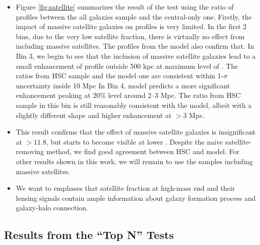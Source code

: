 \documentclass[a4paper,fleqn,usenatbib]{mnras}
\begin{document}
\begin{itemize}
        \item Figure \ref{fig:satellite} summarizes the result of the test using the ratio
            of \dsigma{} profiles between the all galaxies sample and the central-only one.
            Firstly, the impact of massive satellite galaxies on \dsigma{} profiles is very limited.
            In the first 2 bins, due to the very low satellite fraction, there is virtually no 
            effect from including massive satellites. 
            The \dsigma{} profiles from the model also confirm that.
            In Bin 3, we begin to see that the inclusion of massive satellite galaxies
            lead to a small enhancement of \dsigma{} profile outside 500 kpc at maximum level 
            of . The ratios from HSC sample and the  model one are consistent 
            within 1-$\sigma$ uncertainty inside 10 Mpc
            In Bin 4,  model predicts a more significant enhancement peaking at 
            20\% level around 2--3 Mpc.
            The ratio from HSC sample in this bin is still reasonably consistent with the model,
            albeit with a slightly different shape and higher enhancement at $>3$ Mpc.

        \item This result confirms that the effect of massive satellite galaxies is insignificant 
            at \logmmax{}$>11.8$, but starts to become visible at lower \mmax{}.
            Despite the naive satellite-removing method, we find good agreement between HSC and 
            model. 
            For other results shown in this work, we will remain to use the samples including 
            massive satellites.
        
        \item We want to emphases that satellite fraction at high-mass end and their lensing 
            signals contain ample information about galaxy formation process and galaxy-halo 
            connection. 
        
    \end{itemize}

\subsection{Results from the ``Top N'' Tests}
    \label{sec:topn_results}
\end{document}
